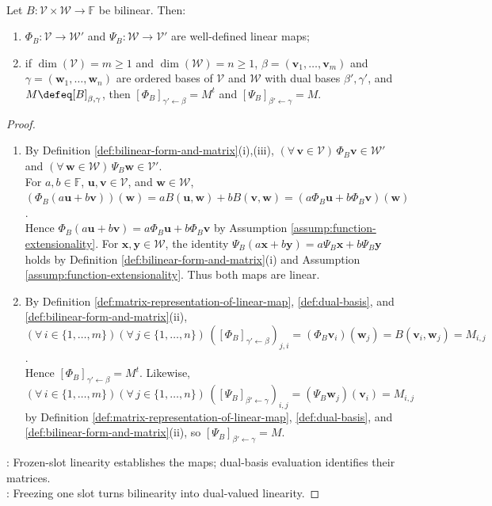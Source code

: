 \begin{proposition} \label{prop:bilinear-forms-linearize-through-duals} \\
Let $B:\mathcal{V}\times\mathcal{W}\to\mathbb{F}$ be bilinear. Then:
\begin{enumerate}[label=(\roman*)]
\setlength{\itemsep}{0pt}
\item $\Phi_B:\mathcal{V}\to\mathcal{W}'$ and $\Psi_B:\mathcal{W}\to\mathcal{V}'$ are well-defined linear maps;
\item if $\dim(\mathcal{V})=m\geq1$ and $\dim(\mathcal{W})=n\geq1$, $\beta=(\mathbf{v}_1,\ldots,\mathbf{v}_m)$ and $\gamma=(\mathbf{w}_1,\ldots,\mathbf{w}_n)$ are ordered bases of $\mathcal{V}$ and $\mathcal{W}$ with dual bases $\beta',\gamma'$, and $M\defeq[B]_{\beta,\gamma}$, then $[\Phi_B]_{\gamma'\leftarrow\beta}=M^t$ and $[\Psi_B]_{\beta'\leftarrow\gamma}=M$.
\end{enumerate}
\begin{proof}
\begin{enumerate}[label=(\roman*)]
\setlength{\itemsep}{0pt}
\item By Definition \ref{def:bilinear-form-and-matrix}(i),(iii), $(\forall\,\mathbf{v}\in\mathcal{V})\,\Phi_B\mathbf{v}\in\mathcal{W}'$ and $(\forall\,\mathbf{w}\in\mathcal{W})\,\Psi_B\mathbf{w}\in\mathcal{V}'$.\\
For $a,b\in\mathbb{F}$, $\mathbf{u},\mathbf{v}\in\mathcal{V}$, and $\mathbf{w}\in\mathcal{W}$, $(\Phi_B(a\mathbf{u}+b\mathbf{v}))(\mathbf{w})=aB(\mathbf{u},\mathbf{w})+bB(\mathbf{v},\mathbf{w})=(a\Phi_B\mathbf{u}+b\Phi_B\mathbf{v})(\mathbf{w})$.\\
Hence $\Phi_B(a\mathbf{u}+b\mathbf{v})=a\Phi_B\mathbf{u}+b\Phi_B\mathbf{v}$ by Assumption \ref{assump:function-extensionality}. For $\mathbf{x},\mathbf{y}\in\mathcal{W}$, the identity $\Psi_B(a\mathbf{x}+b\mathbf{y})=a\Psi_B\mathbf{x}+b\Psi_B\mathbf{y}$ holds by Definition \ref{def:bilinear-form-and-matrix}(i) and Assumption \ref{assump:function-extensionality}. Thus both maps are linear.
\item By Definition \ref{def:matrix-representation-of-linear-map}, \ref{def:dual-basis}, and \ref{def:bilinear-form-and-matrix}(ii), $(\forall\,i\in\{1,\ldots,m\})(\forall\,j\in\{1,\ldots,n\})\,([\Phi_B]_{\gamma'\leftarrow\beta})_{j,i}=(\Phi_B\mathbf{v}_i)(\mathbf{w}_j)=B(\mathbf{v}_i,\mathbf{w}_j)=M_{i,j}$.\\
Hence $[\Phi_B]_{\gamma'\leftarrow\beta}=M^t$. Likewise, $(\forall\,i\in\{1,\ldots,m\})(\forall\,j\in\{1,\ldots,n\})\,([\Psi_B]_{\beta'\leftarrow\gamma})_{i,j}=(\Psi_B\mathbf{w}_j)(\mathbf{v}_i)=M_{i,j}$ by Definition \ref{def:matrix-representation-of-linear-map}, \ref{def:dual-basis}, and \ref{def:bilinear-form-and-matrix}(ii), so $[\Psi_B]_{\beta'\leftarrow\gamma}=M$.
\end{enumerate}
: Frozen-slot linearity establishes the maps; dual-basis evaluation identifies their matrices.\\
: Freezing one slot turns bilinearity into dual-valued linearity.
\end{proof}
\end{proposition}


